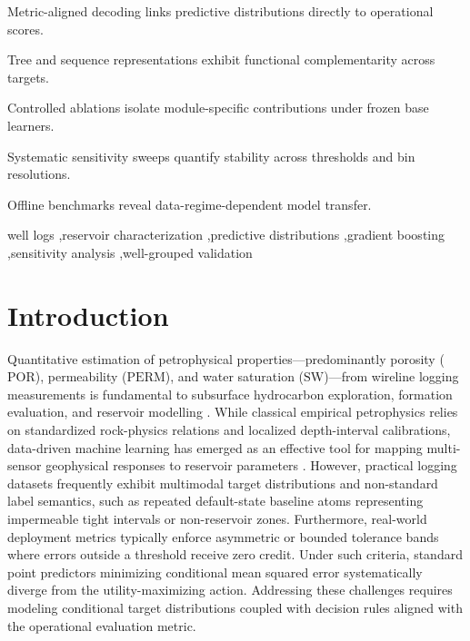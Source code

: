 \documentclass[preprint,12pt,nopreprintline]{elsarticle}
\begin{document}
\begin{frontmatter}
\begin{abstract}
\end{abstract}
\begin{highlights}
\item Metric-aligned decoding links predictive distributions directly to operational scores.
\item Tree and sequence representations exhibit functional complementarity across targets.
\item Controlled ablations isolate module-specific contributions under frozen base learners.
\item Systematic sensitivity sweeps quantify stability across thresholds and bin resolutions.
\item Offline benchmarks reveal data-regime-dependent model transfer.
\end{highlights}
\begin{keyword}
well logs \sep reservoir characterization \sep predictive distributions \sep gradient boosting \sep sensitivity analysis \sep well-grouped validation
\end{keyword}
\end{frontmatter}

\section{Introduction}
\label{sec:intro}
Quantitative estimation of petrophysical properties—predominantly porosity ($\mathrm{POR}$), permeability ($\mathrm{PERM}$), and water saturation ($\mathrm{SW}$)—from wireline logging measurements is fundamental to subsurface hydrocarbon exploration, formation evaluation, and reservoir modelling \cite{archie1942,wyllie1958,waxman1968}. While classical empirical petrophysics relies on standardized rock-physics relations and localized depth-interval calibrations, data-driven machine learning has emerged as an effective tool for mapping multi-sensor geophysical responses to reservoir parameters \cite{anifowose2017,almudhafar2019,bressan2020}. However, practical logging datasets frequently exhibit multimodal target distributions and non-standard label semantics, such as repeated default-state baseline atoms representing impermeable tight intervals or non-reservoir zones. Furthermore, real-world deployment metrics typically enforce asymmetric or bounded tolerance bands where errors outside a threshold receive zero credit. Under such criteria, standard point predictors minimizing conditional mean squared error systematically diverge from the utility-maximizing action. Addressing these challenges requires modeling conditional target distributions coupled with decision rules aligned with the operational evaluation metric.
\end{document}
